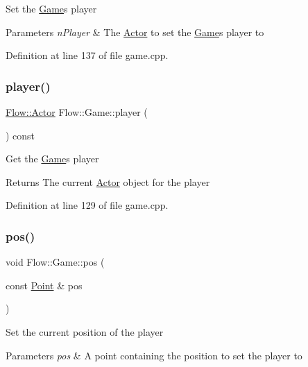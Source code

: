 Set the \hyperlink{class_flow_1_1_game}{Game}\textquotesingle{}s player 
\begin{DoxyParams}{Parameters}
{\em n\+Player} & The \hyperlink{class_flow_1_1_actor}{Actor} to set the \hyperlink{class_flow_1_1_game}{Game}\textquotesingle{}s player to \\
\hline
\end{DoxyParams}


Definition at line 137 of file game.\+cpp.

\hypertarget{class_flow_1_1_game_a8c0df90f917b0111944464cdea5c24fd}{}\label{class_flow_1_1_game_a8c0df90f917b0111944464cdea5c24fd} 
\subsubsection{\texorpdfstring{player()}{player()}\hspace{0.1cm}{\footnotesize\ttfamily [2/2]}}
{\footnotesize\ttfamily \hyperlink{class_flow_1_1_actor}{Flow\+::\+Actor} Flow\+::\+Game\+::player (\begin{DoxyParamCaption}{ }\end{DoxyParamCaption}) const}

Get the \hyperlink{class_flow_1_1_game}{Game}\textquotesingle{}s player \begin{DoxyReturn}{Returns}
The current \hyperlink{class_flow_1_1_actor}{Actor} object for the player 
\end{DoxyReturn}


Definition at line 129 of file game.\+cpp.

\hypertarget{class_flow_1_1_game_a5ee9a0d6a9c1fe708deac4f5b48a01e9}{}\label{class_flow_1_1_game_a5ee9a0d6a9c1fe708deac4f5b48a01e9} 
\subsubsection{\texorpdfstring{pos()}{pos()}\hspace{0.1cm}{\footnotesize\ttfamily [1/2]}}
{\footnotesize\ttfamily void Flow\+::\+Game\+::pos (\begin{DoxyParamCaption}\item[{const \hyperlink{struct_flow_1_1_point}{Point} \&}]{pos }\end{DoxyParamCaption})}

Set the current position of the player 
\begin{DoxyParams}{Parameters}
{\em pos} & A point containing the position to set the player to \\
\hline
\end{DoxyParams}


